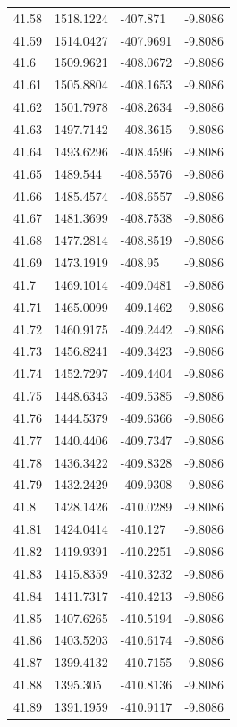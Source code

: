 \begin{table}[H]
\begin{tabular}{llll}
41.58 & 1518.1224 & -407.871 & -9.8086 \\
41.59 & 1514.0427 & -407.9691 & -9.8086 \\
41.6 & 1509.9621 & -408.0672 & -9.8086 \\
41.61 & 1505.8804 & -408.1653 & -9.8086 \\
41.62 & 1501.7978 & -408.2634 & -9.8086 \\
41.63 & 1497.7142 & -408.3615 & -9.8086 \\
41.64 & 1493.6296 & -408.4596 & -9.8086 \\
41.65 & 1489.544 & -408.5576 & -9.8086 \\
41.66 & 1485.4574 & -408.6557 & -9.8086 \\
41.67 & 1481.3699 & -408.7538 & -9.8086 \\
41.68 & 1477.2814 & -408.8519 & -9.8086 \\
41.69 & 1473.1919 & -408.95 & -9.8086 \\
41.7 & 1469.1014 & -409.0481 & -9.8086 \\
41.71 & 1465.0099 & -409.1462 & -9.8086 \\
41.72 & 1460.9175 & -409.2442 & -9.8086 \\
41.73 & 1456.8241 & -409.3423 & -9.8086 \\
41.74 & 1452.7297 & -409.4404 & -9.8086 \\
41.75 & 1448.6343 & -409.5385 & -9.8086 \\
41.76 & 1444.5379 & -409.6366 & -9.8086 \\
41.77 & 1440.4406 & -409.7347 & -9.8086 \\
41.78 & 1436.3422 & -409.8328 & -9.8086 \\
41.79 & 1432.2429 & -409.9308 & -9.8086 \\
41.8 & 1428.1426 & -410.0289 & -9.8086 \\
41.81 & 1424.0414 & -410.127 & -9.8086 \\
41.82 & 1419.9391 & -410.2251 & -9.8086 \\
41.83 & 1415.8359 & -410.3232 & -9.8086 \\
41.84 & 1411.7317 & -410.4213 & -9.8086 \\
41.85 & 1407.6265 & -410.5194 & -9.8086 \\
41.86 & 1403.5203 & -410.6174 & -9.8086 \\
41.87 & 1399.4132 & -410.7155 & -9.8086 \\
41.88 & 1395.305 & -410.8136 & -9.8086 \\
41.89 & 1391.1959 & -410.9117 & -9.8086 \\

\end{tabular}
\end{table}
